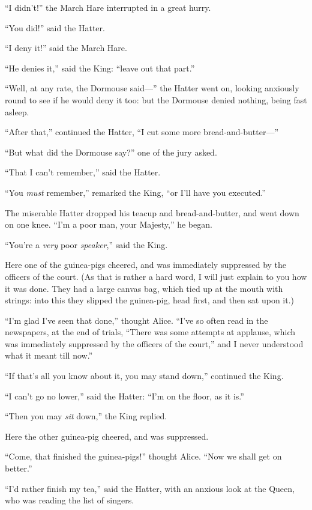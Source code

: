 \documentclass[book, 20pt]{extbook}
\begin{document}
``I didn't!'' the March Hare interrupted in a great hurry.

``You did!'' said the Hatter.

``I deny it!'' said the March Hare.

``He denies it,'' said the King: ``leave out that part.''

``Well, at any rate, the Dormouse said---'' the Hatter went on, looking
anxiously round to see if he would deny it too: but the Dormouse denied
nothing, being fast asleep.

``After that,'' continued the Hatter, ``I cut some more
bread-and-butter---''

``But what did the Dormouse say?'' one of the jury asked.

``That I can't remember,'' said the Hatter.

``You \emph{must} remember,'' remarked the King, ``or I'll have you
executed.''

The miserable Hatter dropped his teacup and bread-and-butter, and went
down on one knee. ``I'm a poor man, your Majesty,'' he began.

``You're a \emph{very} poor \emph{speaker},'' said the King.

Here one of the guinea-pigs cheered, and was immediately suppressed by
the officers of the court. (As that is rather a hard word, I will just
explain to you how it was done. They had a large canvas bag, which tied
up at the mouth with strings: into this they slipped the guinea-pig,
head first, and then sat upon it.)

``I'm glad I've seen that done,'' thought Alice. ``I've so often read in
the newspapers, at the end of trials, ``There was some attempts at
applause, which was immediately suppressed by the officers of the
court,'' and I never understood what it meant till now.''

``If that's all you know about it, you may stand down,'' continued the
King.

``I can't go no lower,'' said the Hatter: ``I'm on the floor, as it
is.''

``Then you may \emph{sit} down,'' the King replied.

Here the other guinea-pig cheered, and was suppressed.

``Come, that finished the guinea-pigs!'' thought Alice. ``Now we shall
get on better.''

``I'd rather finish my tea,'' said the Hatter, with an anxious look at
the Queen, who was reading the list of singers.
\end{document}
